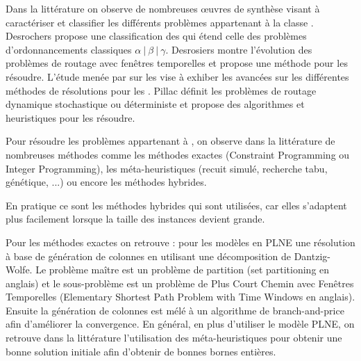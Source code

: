 


Dans la littérature on observe de nombreuses œuvres de synthèse visant à caractériser et classifier les différents problèmes appartenant à la classe \wsrp.
Desrochers \cite{Desrochers1990} propose une classification des \wsrp qui étend celle des problèmes d'ordonnancements classiques $\alpha~|~\beta~|~\gamma$.
Desrosiers \cite{Desrosiers1995} montre l'évolution des problèmes de routage avec fenêtres temporelles et propose une méthode pour les résoudre.
L'étude menée par \cite{Solomon1988} sur les \wsrp vise à exhiber les avancées sur les différentes méthodes de résolutions pour les \wsrp.
Pillac \cite{pillac2012dynamic} définit les problèmes de routage dynamique stochastique ou déterministe et propose des algorithmes et heuristiques pour les résoudre.



Pour résoudre les problèmes appartenant à \wsrp, on observe dans la littérature de nombreuses méthodes comme les méthodes exactes (Constraint Programming ou Integer Programming), les méta-heuristiques (recuit simulé, recherche tabu, génétique, ...) ou encore les méthodes hybrides.

En pratique ce sont les méthodes hybrides qui sont utilisées, car elles s'adaptent plus facilement lorsque la taille des instances devient grande.

Pour les méthodes exactes on retrouve : pour les modèles en PLNE une résolution à base de génération de colonnes en utilisant une décomposition de Dantzig-Wolfe.
Le problème maître est un problème de partition (set partitioning en anglais) et le sous-problème est un problème de Plus Court Chemin avec Fenêtres Temporelles (Elementary Shortest Path Problem with Time Windows en anglais). Ensuite la génération de colonnes est mélé à un algorithme de branch-and-price afin d'améliorer la convergence. 
En général, en plus d'utiliser le modèle PLNE, on retrouve dans la littérature l'utilisation des méta-heuristiques pour obtenir une bonne solution initiale afin d'obtenir de bonnes bornes entières.

